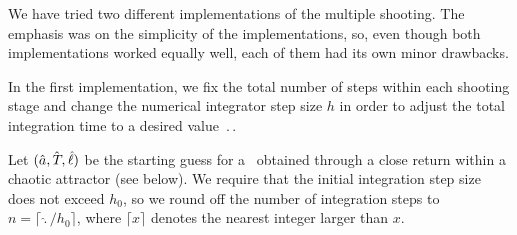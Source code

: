 We have tried two different implementations of the multiple shooting.
The emphasis was on the simplicity of the implementations, so, even
though both implementations worked equally well, each of them had
its own minor drawbacks.

In the first implementation, we fix the total number of steps within
each shooting stage and change the numerical integrator step size
$h$ in order to adjust the total integration time to a desired value
$\period{}$.

Let $(\hat{a}, \hat{{T_{}}}, \hat{\ell})$ be the starting guess for a \rpo\
obtained through a close return within a chaotic attractor (see below).
We require that the initial integration step size
does not exceed $h_0$, so we round off the
number of integration steps to $n = \lceil \hat{\period{}}/h_0\rceil$, where
$\lceil x \rceil$ denotes the nearest integer larger than $x$.

